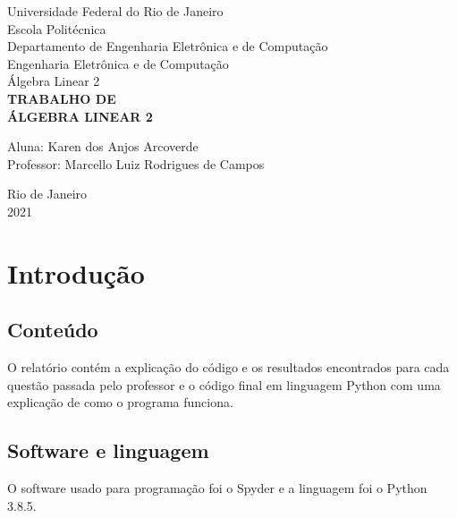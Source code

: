 \documentclass[a4paper,12pt,twoside]{article}
\date{}
\begin{document}
\begin{titlepage} %
\begin{center} %
{\large Universidade Federal do Rio de Janeiro}\\[0.2cm] %
{\large Escola Politécnica}\\[0.2cm] %
{\large Departamento de Engenharia Eletrônica e de Computação}\\[0.2cm]
{\large Engenharia Eletrônica e de Computação}\\[0.2cm]
{\large Álgebra Linear 2}\\[5.1cm]
{\bf \huge TRABALHO DE}\\ %
{\bf \huge ÁLGEBRA LINEAR 2}\\[5.1cm] 
\end{center} %
{\large Aluna: Karen dos Anjos Arcoverde}\\[0.7cm] %
{\large Professor: Marcello Luiz Rodrigues de Campos}\\[5.1cm]
\begin{center}
{\large Rio de Janeiro}\\[0.2cm]
{\large 2021}
\end{center}
\end{titlepage} %


\renewcommand{\contentsname}{Sumário}

\tableofcontents
\clearpage





\section{Introdução}
\subsection{Conteúdo}
    O relatório contém a explicação do código e os resultados encontrados para cada questão passada pelo professor e o código final em linguagem Python com uma explicação de como o programa funciona.
\subsection{Software e linguagem}
    O software usado para programação foi o Spyder e a linguagem foi o Python 3.8.5.
\end{document}
